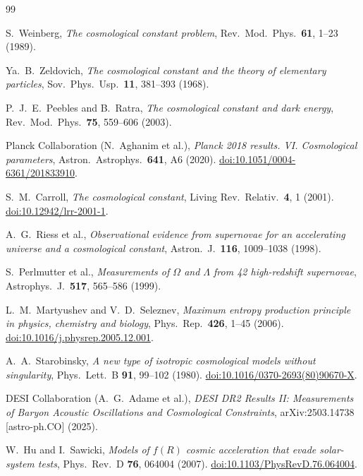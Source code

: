 \documentclass[12pt,a4paper]{article}
\theoremstyle{definition}
\theoremstyle{plain}
\theoremstyle{remark}
\begin{document}
\begin{thebibliography}{99}

S.~Weinberg,
\textit{The cosmological constant problem},
Rev.\ Mod.\ Phys.\ \textbf{61}, 1--23 (1989).

Ya.~B.~Zeldovich,
\textit{The cosmological constant and the theory of elementary particles},
Sov.\ Phys.\ Usp.\ \textbf{11}, 381--393 (1968).

P.~J.~E.~Peebles and B.~Ratra,
\textit{The cosmological constant and dark energy},
Rev.\ Mod.\ Phys.\ \textbf{75}, 559--606 (2003).

Planck Collaboration (N.~Aghanim et al.),
\textit{Planck 2018 results. VI. Cosmological parameters},
Astron.\ Astrophys.\ \textbf{641}, A6 (2020).
\href{https://doi.org/10.1051/0004-6361/201833910}{doi:10.1051/0004-6361/201833910}.

S.~M.~Carroll,
\textit{The cosmological constant},
Living Rev.\ Relativ.\ \textbf{4}, 1 (2001).
\href{https://doi.org/10.12942/lrr-2001-1}{doi:10.12942/lrr-2001-1}.

A.~G.~Riess et al.,
\textit{Observational evidence from supernovae for an accelerating
universe and a cosmological constant},
Astron.\ J.\ \textbf{116}, 1009--1038 (1998).

S.~Perlmutter et al.,
\textit{Measurements of $\Omega$ and $\Lambda$ from 42 high-redshift
supernovae},
Astrophys.\ J.\ \textbf{517}, 565--586 (1999).

L.~M.~Martyushev and V.~D.~Seleznev,
\textit{Maximum entropy production principle in physics, chemistry and biology},
Phys.\ Rep.\ \textbf{426}, 1--45 (2006).
\href{https://doi.org/10.1016/j.physrep.2005.12.001}{doi:10.1016/j.physrep.2005.12.001}.

A.~A.~Starobinsky,
\textit{A new type of isotropic cosmological models without singularity},
Phys.\ Lett.\ B \textbf{91}, 99--102 (1980).
\href{https://doi.org/10.1016/0370-2693(80)90670-X}{doi:10.1016/0370-2693(80)90670-X}.

DESI Collaboration (A.~G.~Adame et al.),
\textit{DESI DR2 Results II: Measurements of Baryon Acoustic Oscillations and Cosmological Constraints},
arXiv:2503.14738 [astro-ph.CO] (2025).

W.~Hu and I.~Sawicki,
\textit{Models of $f(R)$ cosmic acceleration that evade solar-system tests},
Phys.\ Rev.\ D \textbf{76}, 064004 (2007).
\href{https://doi.org/10.1103/PhysRevD.76.064004}{doi:10.1103/PhysRevD.76.064004}.


\end{thebibliography}
\end{document}
